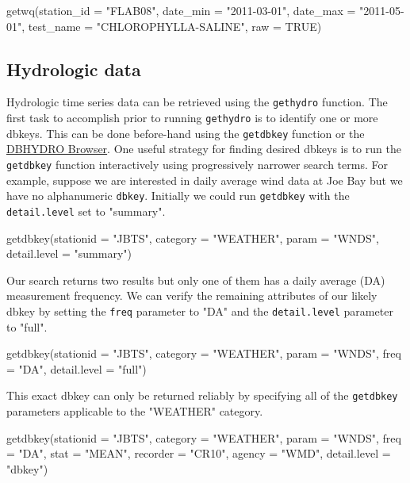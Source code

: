 \documentclass[12pt,notitlepage]{article}
\begin{document}
\begin{Schunk}
\begin{Sinput}
 getwq(station_id = "FLAB08", date_min = "2011-03-01", 
       date_max = "2011-05-01", test_name = "CHLOROPHYLLA-SALINE",
       raw = TRUE)
\end{Sinput}
\end{Schunk}

\subsection{Hydrologic data}

Hydrologic time series data can be retrieved using the \texttt{gethydro} function. The first task to accomplish prior to running \texttt{gethydro} is to identify one or more dbkeys. This can be done before-hand using the \texttt{getdbkey} function or the \href{http://my.sfwmd.gov/dbhydroplsql/show_dbkey_info.main_menu}{DBHYDRO Browser}. One useful strategy for finding desired dbkeys is to run the \texttt{getdbkey}   function interactively using progressively narrower search terms. For example, suppose we are interested in daily average wind data at Joe Bay but we have no alphanumeric \texttt{dbkey}. Initially we could run \texttt{getdbkey} with the \texttt{detail.level} set to "summary".

\begin{Schunk}
\begin{Sinput}
 getdbkey(stationid = "JBTS", category = "WEATHER", param = "WNDS",
          detail.level = "summary")
\end{Sinput}
\end{Schunk}

\noindent Our search returns two results but only one of them has a daily average (DA) measurement frequency. We can verify the remaining attributes of our likely dbkey by setting the \texttt{freq} parameter to "DA" and the \texttt{detail.level} parameter to "full".

\begin{Schunk}
\begin{Sinput}
 getdbkey(stationid = "JBTS", category = "WEATHER", param = "WNDS",
          freq = "DA", detail.level = "full")
\end{Sinput}
\end{Schunk}

\noindent This exact dbkey can only be returned reliably by specifying all of the \texttt{getdbkey} parameters applicable to the "WEATHER" category.

\begin{Schunk}
\begin{Sinput}
 getdbkey(stationid = "JBTS", category = "WEATHER", param = "WNDS",
          freq = "DA", stat = "MEAN", recorder = "CR10", agency = "WMD",
          detail.level = "dbkey")
\end{Sinput}
\end{Schunk}
\end{document}
